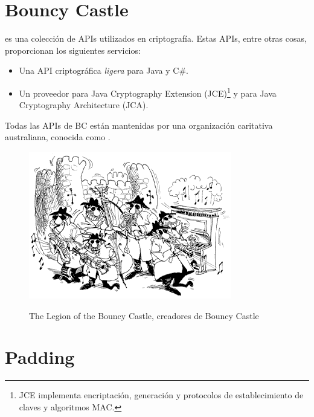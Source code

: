 
 \section{Bouncy Castle}

  es una colección de APIs utilizados en criptografía.
 Estas APIs, entre otras cosas, proporcionan los siguientes servicios:
 \begin{itemize}
 \item Una API criptográfica \emph{ligera} para Java y C\#.
 \item Un proveedor para Java Cryptography Extension (JCE)\footnote{JCE implementa encriptación, generación y protocolos de establecimiento de claves y algoritmos MAC.} y para Java Cryptography Architecture (JCA).
 \end{itemize}

 Todas las APIs de BC están mantenidas por una organización caritativa australiana, conocida como . \emph{\parencite{Reference4}}

 \begin{figure}[ht]
   \centering
   \includegraphics[scale=0.5]{Figures/BouncyCastle}
   \decoRule
   \caption[Legion of the Bouncy Castle]{The Legion of the Bouncy Castle, creadores de Bouncy Castle} \emph{\parencite{Reference4}}
   \label{fig:BouncyCastle}
 \end{figure}


 \section{Padding}

